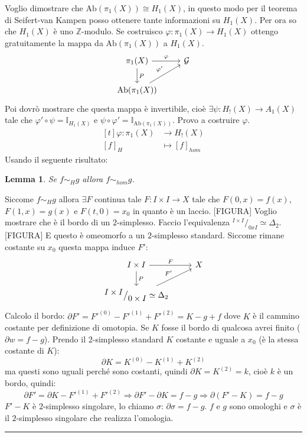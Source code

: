 \documentclass[10pt, twoside=false, x11names]{scrbook}
\newtheorem{lemma}[theorem]{Lemma}
\newenvironment{proof}{{\textbf{Dimostrazione}:}}{\hfill\rule{2mm}{2mm} \newline}
\newcommand{\Z}{\mathbb{Z}}
\renewcommand{\phi}{\varphi}
\newcommand{\Id}[1][]{\mathbb{I}_#1}
\newcommand{\Ab}[1]{\mathrm{Ab}( #1 )}
\newcommand*\quot[2]{{^{\textstyle #1}\big/_{\textstyle #2}}}
\begin{document}
Voglio dimostrare che $ \Ab{\pi_1(X)} \cong H_1(X) $, in questo modo per il teorema di Seifert-van Kampen posso ottenere tante
informazioni su $ H_1(X) $. Per ora so che $ H_1(X) $ è uno $ \Z $-modulo. Se costruisco $ \phi: \pi_1(X) \to H_1(X) $ ottengo
gratuitamente la mappa da $ \Ab{\pi_1(X)} $ a $ H_1(X) $.
\[
  \begin{tikzcd}
    \pi_1(X) \arrow{r}{\phi} \arrow{d}{P} & \mathcal{G} \\
    \Ab{\pi_1(X)} \arrow{ur}{\phi'}
  \end{tikzcd}
\]
Poi dovrò mostrare che questa mappa è invertibile, cioè $ \exists \psi:H_!(X) \to A_1(X) $ tale che $ \phi' \circ \psi = \Id{H_1(X)} $ e
$ \psi \circ \phi' = \Id{\Ab{\pi_1(X)}} $. Provo a costruire $ \phi $.
\[
  \begin{aligned}[t]
    \phi:  \pi_1(X) & \to H_!(X) \\
    [f]_H & \mapsto [f]_{hom}
  \end{aligned}
\]
Usando il seguente risultato:
\begin{lemma}
  Se $ f \sim_H g $ allora $ f \sim_{hom} g $.
\end{lemma}
\begin{proof}
  Siccome $ f \sim_{H} g $ allora $ \exists F $ continua tale $ F: I \times I \to X $ tale che $ F(0,x) = f(x) $,
  $ F(1,x) = g(x) $ e $ F(t,0) = x_0 $ in quanto è un laccio.
  [FIGURA]
  Voglio mostrare che è il bordo di un $ 2 $-simplesso. Faccio l'equivalenza $ \quot{I \times I}{0xI} \simeq \Delta_2 $.
  [FIGURA]
  E questo è omeomorfo a un $ 2 $-simplesso standard.
  Siccome rimane costante su $ x_0 $ questa mappa induce $ F' $:
  \[
    \begin{tikzcd}
      I \times I \arrow{r}{F} \arrow{d}{P} & X \\
      \quot{I \times I}{0 \times I} \simeq \Delta_2 \arrow{ur}{F'}
    \end{tikzcd}
  \]
  Calcolo il bordo: $ \partial F' = F'^{(0)} - F'^{(1)} + F'^{(2)} = K - g + f $
  dove $ K $ è il cammino costante per definizione di omotopia. Se $ K $
  fosse il bordo di qualcosa avrei finito ($ \partial w = f - g $). Prendo il $ 2 $-simplesso
  standard $ K $ costante e uguale a $ x_0 $ (è la stessa costante di $ K $):
  \[
    \partial K = K^{(0)} - K^{(1)} + K^{(2)}
  \]
  ma questi sono uguali perché sono costanti, quindi $ \partial K = K^{(2)} = k $, cioè $ k $
  è un bordo, quindi:
  \[
    \partial F' = \partial K - F'^{(1)} + F'^{(2)} \Rightarrow \partial F' - \partial K = f - g \Rightarrow \partial(F' - K) = f - g
  \]
  $ F' - K $ è $ 2 $-simplesso singolare, lo chiamo $ \sigma $: $ \partial \sigma = f - g $.
  $ f $ e $ g $ sono omologhi e $ \sigma $ è il $ 2 $-simplesso singolare che realizza
  l'omologia.
\end{proof}
\end{document}
